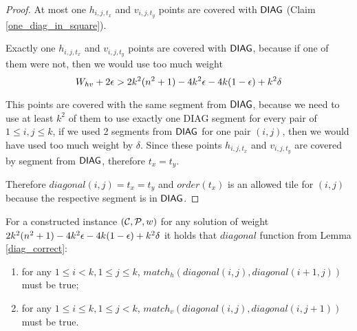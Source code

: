 \begin{proof}
At most one $h_{i,j,t_x}$ and $v_{i,j,t_y}$
points are covered with $\mathsf{DIAG}$
(Claim \ref{one_diag_in_square}).
	
Exactly one $h_{i,j,t_x}$ and $v_{i,j,t_y}$
points are covered with $\mathsf{DIAG}$,
because if one of them were not, then we would use too much weight
$$W_{hv} + 2\epsilon > 2k^2(n^2+1) - 4k^2\epsilon -4k(1-\epsilon) +k^2\delta$$

This points are covered with the same segment from $\mathsf{DIAG}$,
because we need to use at least $k^2$ of them to use
exactly one DIAG segment for every pair of $1 \le i,j \le k$,
if we used 2 segments from $\mathsf{DIAG}$
for one pair $(i,j)$,
then we would have used too much weight by $\delta$.
Since these points $h_{i,j,t_x}$ and $v_{i,j,t_y}$ are covered by
segment from $\mathsf{DIAG}$, therefore $t_x = t_y$.

Therefore $diagonal(i,j) = t_x = t_y$
and $order(t_x)$ is an allowed tile for $(i,j)$
because the respective segment is in $\mathsf{DIAG}$.

\end{proof}

\begin{lemma}
\label{vertical_horizontal_synchronized}
For a constructed instance $(\mathcal{C}, \mathcal{P}, w)$
for any solution of weight $2k^2(n^2+1) - 4k^2\epsilon -4k(1-\epsilon) +k^2\delta$ it holds that $diagonal$ function
from Lemma \ref{diag_correct}:
\begin{enumerate}
\item 
for any $1 \le i < k, 1 \le j \le k$,
$match_h(diagonal(i, j),diagonal(i+1, j))$ must be true;
\item 
for any $1 \le i \le k, 1 \le j < k$,
$match_v(diagonal(i, j),diagonal(i, j+1))$ must be true.
\end{enumerate}
\end{lemma}


